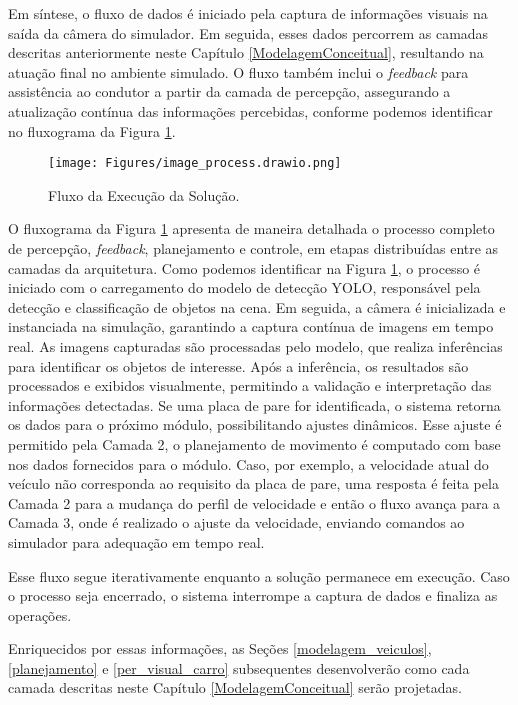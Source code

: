 Em síntese, o fluxo de dados é iniciado pela captura de informações visuais na saída da câmera do simulador. Em seguida, esses dados percorrem as camadas descritas anteriormente neste Capítulo \ref{ModelagemConceitual}, resultando na atuação final no ambiente simulado. O fluxo também inclui o \textit{feedback} para assistência ao condutor a partir da camada de percepção, assegurando a atualização contínua das informações percebidas, conforme podemos identificar no fluxograma da Figura \ref{fluxo_percepcao}.


\begin{figure}[H]
\centering
\texttt{[image: Figures/image\_process.drawio.png]}
\caption{Fluxo da Execução da Solução.}
\label{fluxo_percepcao}
\end{figure}

O fluxograma da Figura \ref{fluxo_percepcao} apresenta de maneira detalhada o processo completo de percepção, \textit{feedback}, planejamento e controle, em etapas distribuídas entre as camadas da arquitetura.
Como podemos identificar na Figura \ref{fluxo_percepcao}, o processo é iniciado com o carregamento do modelo de detecção YOLO, responsável pela detecção e classificação de objetos na cena. Em seguida, a câmera é inicializada e instanciada na simulação, garantindo a captura contínua de imagens em tempo real. As imagens capturadas são processadas pelo modelo, que realiza inferências para identificar os objetos de interesse.
Após a inferência, os resultados são processados e exibidos visualmente, permitindo a validação e interpretação das informações detectadas. Se uma placa de pare for identificada, o sistema retorna os dados para o próximo módulo, possibilitando ajustes dinâmicos. Esse ajuste é permitido pela Camada 2, o planejamento de movimento é computado com base nos dados fornecidos para o módulo. Caso, por exemplo, a velocidade atual do veículo não corresponda ao requisito da placa de pare, uma resposta é feita pela Camada 2 para a mudança do perfil de velocidade e então o fluxo avança para a Camada 3, onde é realizado o ajuste da velocidade, enviando comandos ao simulador para adequação em tempo real.

Esse fluxo segue iterativamente enquanto a solução permanece em execução. Caso o processo seja encerrado, o sistema interrompe a captura de dados e finaliza as operações.

Enriquecidos por essas informações, as Seções \ref{modelagem_veiculos}, \ref{planejamento} e \ref{per_visual_carro} subsequentes desenvolverão como cada camada descritas neste Capítulo \ref{ModelagemConceitual} serão projetadas.

